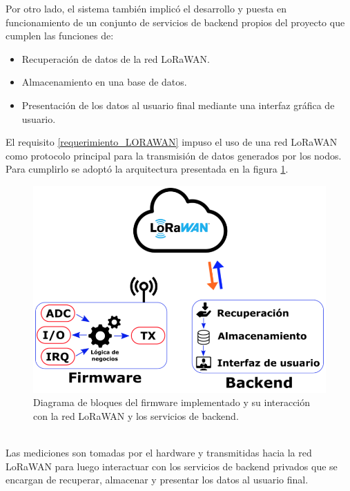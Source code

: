 Por otro lado, el sistema también implicó el desarrollo y puesta en funcionamiento de un conjunto de servicios de backend propios del proyecto que cumplen las funciones de:
\begin{itemize}
	\item Recuperación de datos de la red LoRaWAN.
	\item Almacenamiento en una base de datos.
	\item Presentación de los datos al usuario final mediante una interfaz gráfica de usuario.
\end{itemize}

El requisito \ref{requerimiento_LORAWAN} impuso el uso de una red LoRaWAN como protocolo principal para la transmisión de datos generados por los nodos. Para cumplirlo se adoptó la arquitectura presentada en la figura \ref{fig:diagramadebloquesdebes}.\\
\begin{figure}[h!]
	\centering
	\includegraphics[width=0.8\linewidth]{Figures/diagrama_de_bloques_de_BES}
	\caption{Diagrama de bloques del firmware implementado y su interacción con la red LoRaWAN y los servicios de backend.}
	\label{fig:diagramadebloquesdebes}
\end{figure}\\
Las mediciones son tomadas por el hardware y transmitidas hacia la red LoRaWAN para luego interactuar con los servicios de backend privados que se encargan de recuperar, almacenar y presentar los datos al usuario final.\\

